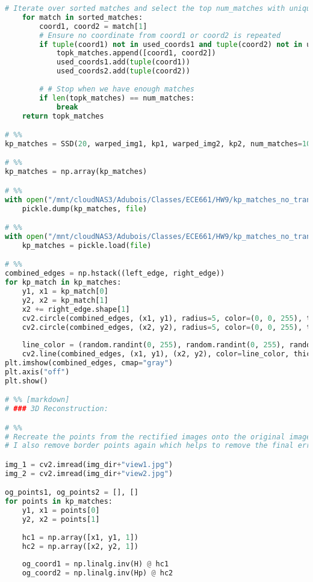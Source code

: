 \documentclass{article}
\begin{document}
\begin{lstlisting}[language=Python]
    # Iterate over sorted matches and select the top num_matches with unique points
    for match in sorted_matches:
        coord1, coord2 = match[1]
        # Ensure no coordinate from coord1 or coord2 is repeated
        if tuple(coord1) not in used_coords1 and tuple(coord2) not in used_coords2:
            topk_matches.append([coord1, coord2])
            used_coords1.add(tuple(coord1))
            used_coords2.add(tuple(coord2))
        
        # # Stop when we have enough matches
        if len(topk_matches) == num_matches:
            break
    return topk_matches

# %%
kp_matches = SSD(20, warped_img1, kp1, warped_img2, kp2, num_matches=1000)

# %%
kp_matches = np.array(kp_matches)

# %%
with open("/mnt/cloudNAS3/Adubois/Classes/ECE661/HW9/kp_matches_no_translate.pkl", "wb") as file:
    pickle.dump(kp_matches, file)

# %%
with open("/mnt/cloudNAS3/Adubois/Classes/ECE661/HW9/kp_matches_no_translate.pkl", "rb") as file:
    kp_matches = pickle.load(file)

# %%
combined_edges = np.hstack((left_edge, right_edge))
for kp_match in kp_matches:
    y1, x1 = kp_match[0]
    y2, x2 = kp_match[1]
    x2 += right_edge.shape[1]
    cv2.circle(combined_edges, (x1, y1), radius=5, color=(0, 0, 255), thickness=-1)
    cv2.circle(combined_edges, (x2, y2), radius=5, color=(0, 0, 255), thickness=-1)
    
    line_color = (random.randint(0, 255), random.randint(0, 255), random.randint(0, 255))
    cv2.line(combined_edges, (x1, y1), (x2, y2), color=line_color, thickness=2)
plt.imshow(combined_edges, cmap="gray")
plt.axis("off")
plt.show()

# %% [markdown]
# ### 3D Reconstruction:

# %%
# Recreate the points from the rectified images onto the original image
# I also remove border points again which helps to remove the final errors. I do this by applying a mask around the border of the image

img_1 = cv2.imread(img_dir+"view1.jpg")
img_2 = cv2.imread(img_dir+"view2.jpg")

og_points1, og_points2 = [], []
for points in kp_matches:
    y1, x1 = points[0]
    y2, x2 = points[1]
    
    hc1 = np.array([x1, y1, 1])
    hc2 = np.array([x2, y2, 1])
    
    og_coord1 = np.linalg.inv(H) @ hc1
    og_coord2 = np.linalg.inv(Hp) @ hc2
    

\end{lstlisting}
\end{document}
